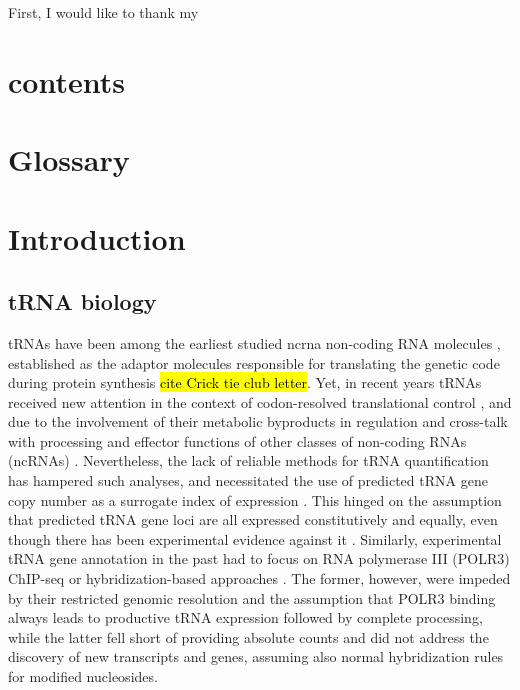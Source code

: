 \documentclass[12pt]{rockefeller}
\begin{document}
First, I would like to thank my  

\chapter*{contents}
\renewcommand\contentsname{Table of Contents}
\tableofcontents
\cleardoublepage
{}
{}
\listoffigures
\cleardoublepage
{}
{}
\listoftables

\chapter*{Glossary}
\printglossary[type=\acronymtype,nonumberlist,title={List of Abbreviations}]

\mainmatter
\pagestyle{fancy}
\fancyhf{}
\lhead{\chaptername\ \thechapter}
\rhead{\thesection}
\rfoot{\thepage}

\chapter{Introduction}
\section{tRNA biology}
tRNAs have been among the earliest studied \gls{ncrna} non-coding RNA molecules \cite{Woese:1967, Soll:1995}, established as the adaptor molecules responsible for translating the genetic code during protein synthesis \hl{cite Crick tie club letter}.
Yet, in recent years tRNAs received new attention in the context of codon-resolved translational control \cite{Dana:2012kq,Dana:2014bs,Mahlab:2012dg,Plotkin:2010fu,Tuller:2010ge,Weinberg:2016kh}, and due to the involvement of their metabolic byproducts in regulation and cross-talk with processing and effector functions of other classes of non-coding RNAs (ncRNAs) \cite{Hasler:2016ce,Ivanov:2011iu,Lee:2009fb}. Nevertheless, the lack of reliable methods for tRNA quantification has hampered such analyses, and necessitated the use of predicted tRNA gene copy number as a surrogate index of expression \cite{Iben:2014dt,Pechmann:2012ey,Tuller:2010ge}. This hinged on the assumption that predicted tRNA gene loci are all expressed constitutively and equally, even though there has been experimental evidence against it \cite{Gingold:2014iz}. Similarly, experimental tRNA gene annotation in the past had to focus on RNA polymerase III (POLR3) ChIP-seq \cite{Kutter:2011ff} \cite{Moqtaderi:2010hc} \cite{Oler:2010fb} or hybridization-based approaches \cite{Dittmar:2004fb} \cite{Goodarzi:2016gd}. The former, however, were impeded by their restricted genomic resolution and the assumption that POLR3 binding always leads to productive tRNA expression followed by complete processing, while the latter fell short of providing absolute counts and did not address the discovery of new transcripts and genes, assuming also normal hybridization rules for modified nucleosides.
\end{document}
